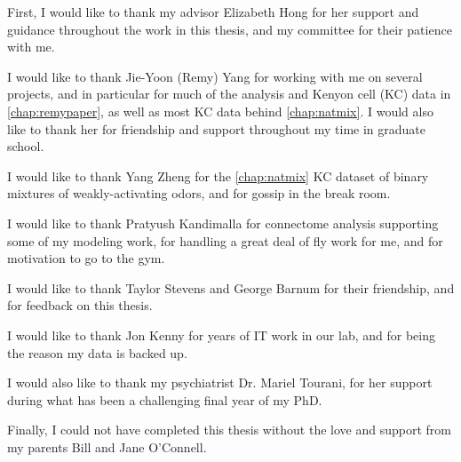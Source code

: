 \documentclass[12pt]{caltech_thesis}
\begin{document}
\begin{acknowledgements}

First, I would like to thank my advisor Elizabeth Hong for her support and guidance throughout the work in this thesis, and my committee for their patience with me.

I would like to thank Jie-Yoon (Remy) Yang for working with me on several projects, and in particular for much of the analysis and Kenyon cell (KC) data in \autoref{chap:remypaper}, as well as most KC data behind \autoref{chap:natmix}.
I would also like to thank her for friendship and support throughout my time in graduate school.

I would like to thank Yang Zheng for the \autoref{chap:natmix} KC dataset of binary mixtures of weakly-activating odors, and for gossip in the break room.

I would like to thank Pratyush Kandimalla for connectome analysis supporting some of my modeling work, for handling a great deal of fly work for me, and for motivation to go to the gym.

I would like to thank Taylor Stevens and George Barnum for their friendship, and for feedback on this thesis.

I would like to thank Jon Kenny for years of IT work in our lab, and for being the reason my data is backed up.

I would also like to thank my psychiatrist Dr. Mariel Tourani, for her support during what has been a challenging final year of my PhD.

Finally, I could not have completed this thesis without the love and support from my parents Bill and Jane O'Connell.
\end{acknowledgements}
\end{document}
